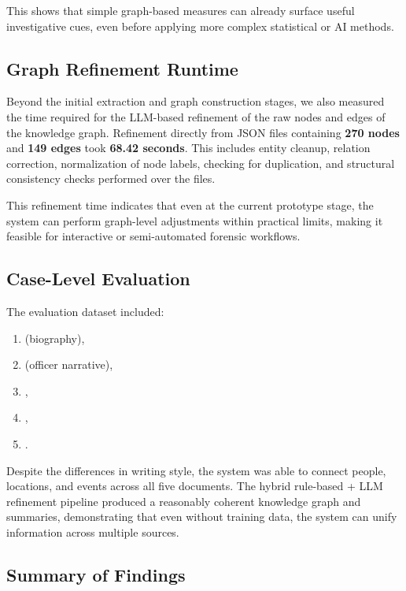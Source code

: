 \documentclass{ieeeaccess}
\begin{document}
This shows that simple graph-based measures can already surface useful investigative cues, even before applying more complex statistical or AI methods.

\subsection{Graph Refinement Runtime}

Beyond the initial extraction and graph construction stages, we also measured the time required for the LLM-based refinement of the raw nodes and edges of the knowledge graph. Refinement directly from JSON files containing \textbf{270 nodes} and \textbf{149 edges} took \textbf{68.42 seconds}. This includes entity cleanup, relation correction, normalization of node labels, checking for duplication, and structural consistency checks performed over the files.

This refinement time indicates that even at the current prototype stage, the system can perform graph-level adjustments within practical limits, making it feasible for interactive or semi-automated forensic workflows.

\subsection{Case-Level Evaluation}
The evaluation dataset included:
\begin{enumerate}
\item {} (biography),
\item {} (officer narrative),
\item {},
\item {},
\item {}.
\end{enumerate}

Despite the differences in writing style, the system was able to connect people, locations, and events across all five documents. The hybrid rule-based + LLM refinement pipeline produced a reasonably coherent knowledge graph and summaries, demonstrating that even without training data, the system can unify information across multiple sources.

\subsection{Summary of Findings}
\end{document}
